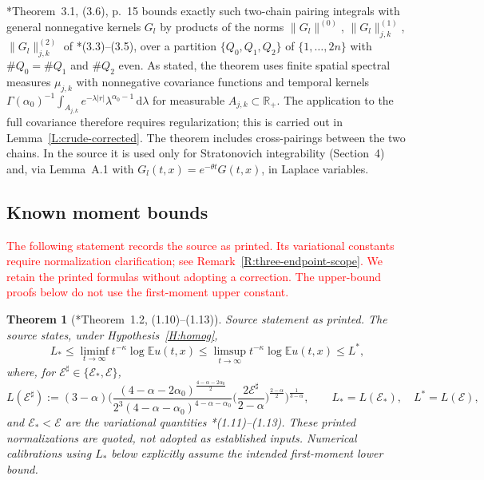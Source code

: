 \documentclass[12pt]{article}
\numberwithin{equation}{section}
\newtheorem{theorem}{Theorem}[section]
\theoremstyle{definition}
\newcommand{\R}{\mathbb{R}}
\newcommand{\E}{\mathbb{E}}
\newcommand{\ud}{\,\mathrm{d}}
\newcommand{\cE}{\mathcal{E}}
\newcommand{\myCmts}[1]{\begin{framed}\noindent\textcolor{red}{#1}\end{framed}}
\begin{document}
\cite{chen:author2026:time-dependency}*{Theorem~3.1, (3.6), p.~15} bounds
exactly such two-chain pairing integrals with general nonnegative kernels
$G_l$ by products of the norms $\|G_l\|^{(0)}$, $\|G_l\|^{(1)}_{j,k}$,
$\|G_l\|^{(2)}_{j,k}$ of \cite{chen:author2026:time-dependency}*{(3.3)--(3.5)},
over a partition $\{Q_0,Q_1,Q_2\}$ of $\{1,\dots,2n\}$ with $\#Q_0=\#Q_1$ and
$\#Q_2$ even. As stated, the theorem uses finite spatial spectral measures
$\mu_{j,k}$ with nonnegative covariance functions and temporal kernels
$\Gamma(\alpha_0)^{-1}\int_{A_{j,k}}e^{-\lambda|r|}
\lambda^{\alpha_0-1}\ud\lambda$ for measurable $A_{j,k}\subset\R_+$.
The application to the full covariance therefore requires regularization;
this is carried out in Lemma~\ref{L:crude-corrected}.
The theorem includes cross-pairings between the two chains. In the
source it is used only for Stratonovich integrability (Section~4) and, via
Lemma~A.1 with $G_l(t,x)=e^{-\theta t}G(t,x)$, in Laplace variables.

\subsection{Known moment bounds}

\myCmts{The following statement records the source as printed. Its
variational constants require normalization clarification; see
Remark~\ref{R:three-endpoint-scope}. We retain the printed formulas
without adopting a correction. The upper-bound proofs below do not
use the first-moment upper constant.}

\begin{theorem}[\cite{chen:author2026:time-dependency}*{Theorem~1.2, (1.10)--(1.13)}]\label{T:first}
  \emph{Source statement as printed.} The source states, under
  Hypothesis~\ref{H:homog},
  \[
    L_*\le\liminf_{t\to\infty}t^{-\kappa}\log\E u(t,x)
    \le\limsup_{t\to\infty}t^{-\kappa}\log\E u(t,x)\le L^*,
  \]
  where, for $\cE^\sharp\in\{\cE_*,\cE\}$,
  \[
    L(\cE^\sharp):=(3-\alpha)\bigg(
    \frac{(4-\alpha-2\alpha_0)^{\frac{4-\alpha-2\alpha_0}{2}}}
    {2^3(4-\alpha-\alpha_0)^{4-\alpha-\alpha_0}}
    \Big(\frac{2\cE^\sharp}{2-\alpha}\Big)^{\frac{2-\alpha}{2}}
    \bigg)^{\frac1{3-\alpha}},
    \qquad L_*=L(\cE_*),\quad L^*=L(\cE),
  \]
  and $\cE_*<\cE$ are the variational quantities
  \cite{chen:author2026:time-dependency}*{(1.11)--(1.13)}.
  These printed normalizations are quoted, not adopted as established
  inputs. Numerical calibrations using $L_*$ below explicitly assume
  the intended first-moment lower bound.
\end{theorem}
\end{document}
